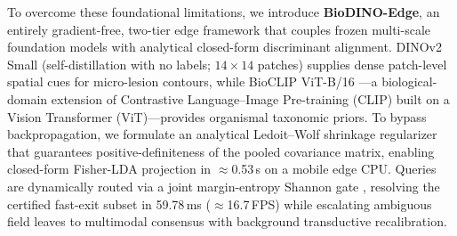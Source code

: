 \documentclass[preprint,12pt]{elsarticle}
\begin{document}
To overcome these foundational limitations, we introduce \textbf{BioDINO-Edge}, an entirely gradient-free, two-tier edge framework that couples frozen multi-scale foundation models with analytical closed-form discriminant alignment. DINOv2 Small (self-distillation with no labels; $14\times 14$ patches) \cite{oquab2023dinov2, caron2021emerging} supplies dense patch-level spatial cues for micro-lesion contours, while BioCLIP ViT-B/16 \cite{stevens2024bioclip}---a biological-domain extension of Contrastive Language--Image Pre-training (CLIP) built on a Vision Transformer (ViT)---provides organismal taxonomic priors. To bypass backpropagation, we formulate an analytical Ledoit--Wolf shrinkage regularizer \cite{ledoit2004well} that guarantees positive-definiteness of the pooled covariance matrix, enabling closed-form Fisher-LDA projection in $\approx$0.53\,s on a mobile edge CPU. Queries are dynamically routed via a joint margin-entropy Shannon gate \cite{shannon1948mathematical}, resolving the certified fast-exit subset in 59.78\,ms ($\approx$16.7\,FPS) while escalating ambiguous field leaves to multimodal consensus with background transductive recalibration.
\end{document}
